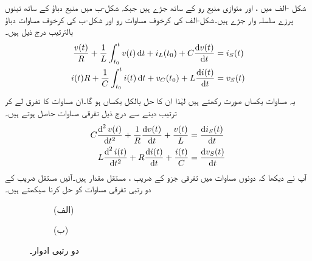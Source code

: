 شکل -الف میں ،  اور  متوازی منبع رو  کے ساتھ جڑے ہیں جبکہ شکل-ب میں منبع دباؤ کے ساتھ تینوں پرزے سلسلہ وار جڑے ہیں۔شکل-الف کی کرخوف مساوات رو اور شکل-ب کی کرخوف مساوات دباؤ بالترتیب درج ذیل ہیں۔
\begin{align*}
\frac{v(t)}{R}+\frac{1}{L}\int_{t_0}^{t} v(t)\dif t+i_L(t_0)+ C\frac{\dif v(t)}{\dif t}&=i_S(t)\\
i(t) R+\frac{1}{C}\int_{t_0}^{t} i(t)\dif t+v_C(t_0)+L \frac{\dif i(t)}{\dif t}&=v_S(t)
\end{align*}
یہ مساوات یکساں صورت رکھتے ہیں لہٰذا ان کا حل بالکل یکساں ہو گا۔ان مساوات کا تفرق لے کر ترتیب دینے سے درج ذیل تفرقی مساوات حاصل ہوتے ہیں۔
\begin{align*}
C\frac{\dif^{\,2} v(t)}{\dif t^2}+\frac{1}{R}\frac{\dif v(t)}{\dif t}+\frac{v(t)}{L}&=\frac{\dif i_S(t)}{\dif t}\\
L\frac{\dif^{\,2} i(t)}{\dif t^2}+R\frac{\dif i(t)}{\dif t}+\frac{i(t)}{C}&=\frac{\dif v_S(t)}{\dif t}
\end{align*}
آپ نے دیکھا کہ دونوں مساوات میں تفرقی جزو کے  ضریب ، مستقل مقدار ہیں۔آئیں مستقل  ضریب  کے دو رتبی تفرقی مساوات کو حل کرنا سیکھتے ہیں۔
 \begin{figure}
\centering
\begin{subfigure}{0.5\textwidth}
\centering
{}%
\caption*{(الف)}
\end{subfigure}
\begin{subfigure}{0.5\textwidth}
\centering
{}%
\caption*{(ب)}
\end{subfigure}
\caption{دو رتبی ادوار۔}
\label{شکل_عارضی_دو_درجی_ادوار}
\end{figure}

